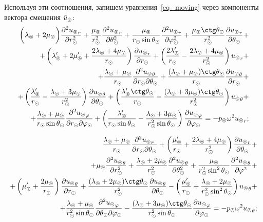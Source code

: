 Используя эти соотношения, запишем уравнения~\eqref{eq_moving} через компоненты вектора смещения $\bar{u}_\circledcirc$:
\begin{equation*}
\begin{split}
\biggl(\la\l+2\mu\l\biggr)\fr{\de^2 {u\l}_r}{\de r\s^2} + \fr{\mu\l}{r\s^2}\fr{\de^2 {u\l}_r}{\de\Q\s^2} +\fr{\mu\l}{r\s\sin\Q\s}\fr{\de^2 {u\l}_r}{\de\f\s^2} + \fr{\mu\l\ctg\Q\s}{r\s^2}\fr{\de {u\l}_r}{\de \Q\s} + \\
+ \left(\la'\l+2\mu'\l+\fr{2\la\l+4\mu\l}{r\s}\right)\fr{\de{u\l}_r}{\de r\s} + \left(\fr{2\la'\l}{r\s} - \fr{2\la\l+4\mu\l}{r\s^2}\right){u\l}_r + \\
+ \fr{\la\l+\mu\l}{r\s}\fr{\de^2 {u\l}_\Q}{\de r\s\de\Q\s} + \fr{(\la\l+\mu\l)\ctg\Q\s}{r\s}\fr{\de {u\l}_\Q}{\de r\s} + \\ 
+ \left(\fr{\la'\l}{r\s} - \fr{\la\l+3\mu\l}{r\s^2}\right)\fr{\de {u\l}_\Q}{\de \Q\s} +\left(\fr{\la'\l\ctg\Q\s}{r\s} - \fr{(\la\l+3\mu\l)\ctg\Q\s}{r\s^2}\right){u\l}_\Q + \\
+\fr{\la\l+\mu\l}{r\s\sin\Q\s}\fr{\de^2 {u\l}_\f}{\de r\s\de\f\s}
+ \left(\fr{\la'\l}{r\s\sin\Q\s} - \fr{\la\s+3\mu\s}{r\s^2\sin\Q\s}\right)\fr{\de {u\l}_\f}{\de \f\s} = -p\l\om^2{u\l}_r;
\end{split}
\end{equation*}

\begin{equation*}
\begin{split}
\fr{\la\l+\mu\l}{r\s}\fr{\de^2 {u\l}_r}{\de r\s \de \Q\s} + \left(\fr{\mu'\l}{r\s}+\fr{2\la\l+4\mu\l}{r\s^2}\right)\fr{\de {u\l}_r}{\de \Q\s} + \\
+ \mu\l \fr{\de^2 {u\l}_\Q}{\de r\s^2} + \fr{\la\l+2\mu\l}{r\s^2}\fr{\de^2 {u\l}_\Q}{\de \Q\s^2} + \fr{\mu\l}{r\s^2\sin^2\Q\s} \fr{\de^2 {u\l}_\Q}{\de \f^2} + \\
+ \left(\mu'\l+ \fr{2\mu\l}{r\s}\right)\fr{\de {u\l}_\Q}{\de r\s} + \fr{(\la\l+2\mu\l)\ctg\Q\s}{r\s^2}\fr{\de{u\l}_\Q}{\de \Q\s}-\left(\fr{\mu'\l}{r\s} + \fr{\la\l+2\mu\l}{r\s^2\sin^2\Q\s}\right){u\l}_\Q + \\
+ \fr{\la\l+\mu\l}{r\s^2\sin\Q\s}\fr{\de^2{u\l}_\f}{\de \Q\s \de \f\s} - \fr{(\la\l+3\mu\l)\ctg\Q\s}{r\s^2\sin\Q\s}\fr{\de {u\l}_\f}{\de \f\s}  = -p\l\om^2{u\l}_\Q;
\end{split}
\end{equation*}

